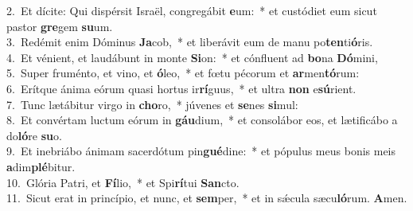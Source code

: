 {2.~}Et dícite: Qui dispérsit Israël, congregábit \textbf{e}um:~* et custódiet eum sicut pastor \textbf{gre}gem \textbf{su}um.\\
{3.~}Redémit enim Dóminus \textbf{Ja}cob,~* et liberávit eum de manu po\textbf{ten}ti\textbf{ó}ris.\\
{4.~}Et vénient, et laudábunt in monte \textbf{Si}on:~* et cónfluent ad \textbf{bo}na \textbf{Dó}mini,\\
{5.~}Super fruménto, et vino, et \textbf{ó}leo,~* et fœtu pécorum et \textbf{ar}men\textbf{tó}rum:\\
{6.~}Erítque ánima eórum quasi hortus ir\textbf{rí}guus,~* et ultra \textbf{non} e\textbf{sú}rient.\\
{7.~}Tunc lætábitur virgo in \textbf{cho}ro,~* júvenes et \textbf{se}nes \textbf{si}mul:\\
{8.~}Et convértam luctum eórum in \textbf{gáu}dium,~* et consolábor eos, et lætificábo a do\textbf{ló}re \textbf{su}o.\\
{9.~}Et inebriábo ánimam sacerdótum pin\textbf{gué}dine:~* et pópulus meus bonis meis \textbf{a}dim\textbf{plé}bitur.\\
{10.~}Glória Patri, et \textbf{Fí}lio,~* et Spi\textbf{rí}tui \textbf{San}cto.\\
{11.~}Sicut erat in princípio, et nunc, et \textbf{sem}per,~* et in sǽcula sæcu\textbf{ló}rum. \textbf{A}men.\\
